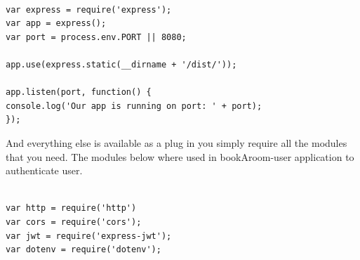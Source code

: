 \begin{itemize}
\begin{verbatim}

var express = require('express');
var app = express();
var port = process.env.PORT || 8080;

app.use(express.static(__dirname + '/dist/'));

app.listen(port, function() {
console.log('Our app is running on port: ' + port);
});

\end{verbatim}
\bigbreak
And everything else is available as a plug in you simply require all the modules that you need. The modules below where used in bookAroom-user application to authenticate user.

\begin{verbatim}

var http = require('http')
var cors = require('cors');
var jwt = require('express-jwt');
var dotenv = require('dotenv');

\end{verbatim}



\end{itemize}
